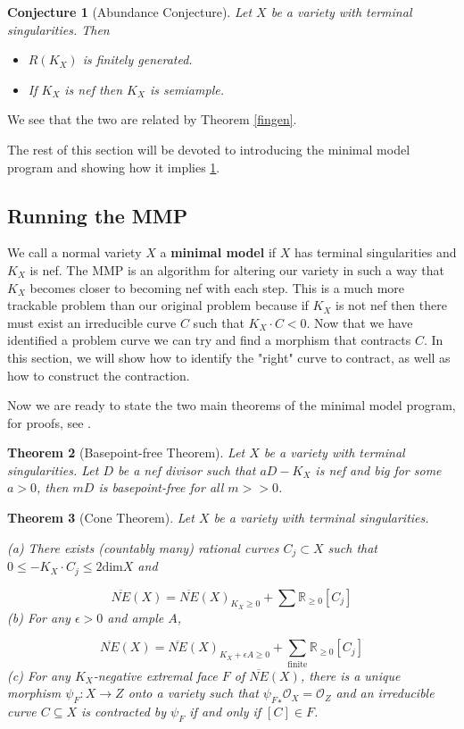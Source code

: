 \documentclass[a4paper]{article}
\newcommand{\Oc}{\mathcal{O}}
\newtheorem{theorem}{Theorem}
\newtheorem{conjecture}[theorem]{Conjecture}
\numberwithin{theorem}{section}
\begin{document}
\begin{conjecture}[Abundance Conjecture]\label{abun}
Let $X$ be a variety with terminal singularities. Then
\begin{itemize}
\item $R(K_X)$ is finitely generated.
\item If $K_X$ is nef then $K_X$ is semiample.
\end{itemize}
\end{conjecture}

We see that the two are related by Theorem \ref{fingen}.

The rest of this section will be devoted to introducing the minimal model program and showing how it implies \ref{abun}.

\subsection{Running the MMP}

We call a normal variety $X$ a \textbf{minimal model} if $X$ has terminal singularities and $K_X$ is nef. The MMP is an algorithm for altering our variety in such a way that $K_X$ becomes closer to becoming nef with each step. This is a much more trackable problem than our original problem because if $K_X$ is not nef then there must exist an irreducible curve $C$ such that $K_X \cdot C < 0$. Now that we have identified a problem curve we can try and find a morphism that contracts $C$. In this section, we will show how to identify the "right" curve to contract, as well as how to construct the contraction.

Now we are ready to state the two main theorems of the minimal model program, for proofs, see \cite{MR1658959}.

\begin{theorem}[Basepoint-free Theorem]\label{bpf}
Let $X$ be a variety with terminal singularities. Let $D$ be a nef divisor such that $aD-K_X$ is nef and big for some $a>0$, then $mD$ is basepoint-free for all $m >> 0$.
\end{theorem}

\begin{theorem}[Cone Theorem]\label{cone}
Let $X$ be a variety with terminal singularities. 

(a) There exists (countably many) rational curves $C_j \subset X$ such that $0 \leq -K_X \cdot C_j \leq 2 \text{dim} X$ and

$$ \overline{NE}(X) = \overline{NE}(X)_{K_X \geq 0} + \sum \mathbb{R}_{\geq 0} [C_j] $$(b) For any $\epsilon > 0$ and ample $A$,

$$ \overline{NE}(X) = \overline{NE}(X)_{K_X + \epsilon A \geq 0} + \sum_{\text{finite}} \mathbb{R}_{\geq 0} [C_j] $$(c) For any $K_X$-negative extremal face $F$ of $\overline{NE}(X)$, there is a unique morphism $\psi_F: X \rightarrow Z$ onto a variety such that ${\psi_F}_* \Oc_X = \Oc_Z$ and an irreducible curve $C \subseteq X$ is contracted by $\psi_F$ if and only if $[C] \in F$.


\end{theorem}
\end{document}
